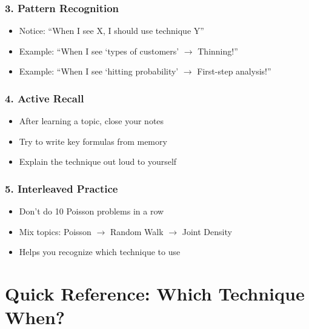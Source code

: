 \documentclass[11pt,letterpaper]{article}
\begin{document}
\subsubsection{3. Pattern Recognition}
\begin{itemize}[leftmargin=*]
  \item Notice: ``When I see X, I should use technique Y''
  \item Example: ``When I see `types of customers' $\rightarrow$ Thinning!''
  \item Example: ``When I see `hitting probability' $\rightarrow$ First-step analysis!''
\end{itemize}

\subsubsection{4. Active Recall}
\begin{itemize}[leftmargin=*]
  \item After learning a topic, close your notes
  \item Try to write key formulas from memory
  \item Explain the technique out loud to yourself
\end{itemize}

\subsubsection{5. Interleaved Practice}
\begin{itemize}[leftmargin=*]
  \item Don't do 10 Poisson problems in a row
  \item Mix topics: Poisson $\rightarrow$ Random Walk $\rightarrow$ Joint Density
  \item Helps you recognize which technique to use
\end{itemize}

\newpage

\section{Quick Reference: Which Technique When?}
\end{document}
